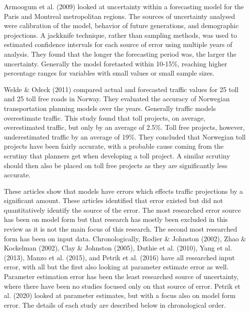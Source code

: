 \documentclass[fancy, masters,twoside]{byuthesis}
\begin{document}
Armoogum et al. (2009) looked at uncertainty within a forecasting model for the Paris and Montreal metropolitan regions. The sources of uncertainty analysed were calibration of the model, behavior of future generations, and demographic projections. A jackknife technique, rather than sampling methods, was used to estimated confidence intervals for each source of error using multiple years of analysis. They found that the longer the forecasting period was, the larger the uncertainty. Generally the model foretasted within 10-15\%, reaching higher percentage ranges for variables with small values or small sample sizes.

Welde \& Odeck (2011) compared actual and forecasted traffic values for 25 toll and 25 toll free roads in Norway. They evaluated the accuracy of Norwegian transportation planning models over the years. Generally traffic models overestimate traffic. This study found that toll projects, on average, overestimated traffic, but only by an average of 2.5\%. Toll free projects, however, underestimated traffic by an average of 19\%. They concluded that Norwegian toll projects have been fairly accurate, with a probable cause coming from the scrutiny that planners get when developing a toll project. A similar scrutiny should then also be placed on toll free projects as they are significantly less accurate.

These articles show that models have errors which effects traffic projections by a significant amount. These articles identified that error existed but did not quantitatively identify the source of the error. The most researched error source has been on model form but that research has mostly been excluded in this review as it is not the main focus of this research. The second most researched form has been on input data. Chronologically, Rodier \& Johnston (2002), Zhao \& Kockelman (2002), Clay \& Johnston (2005), Duthie et al. (2010), Yang et al. (2013), Manzo et al. (2015), and Petrik et al. (2016) have all researched input error, with all but the first also looking at parameter estimate error as well. Parameter estimation error has been the least researched source of uncertainty, where there have been no studies focused only on that source of error. Petrik et al. (2020) looked at parameter estimates, but with a focus also on model form error. The details of each study are described below in chronological order.
\end{document}

